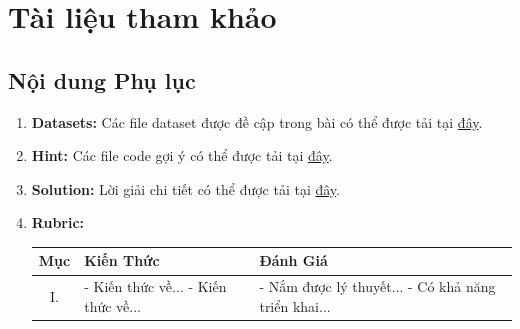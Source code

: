 \documentclass[12pt]{article}
\begin{document}
\newpage
\section{Tài liệu tham khảo}
\label{section:references}
\nocite{*} %
\printbibliography

\newpage
\begin{appendices}

\section{Nội dung Phụ lục}

\begin{enumerate}
    \item \textbf{Datasets:} Các file dataset được đề cập trong bài có thể được tải tại \href{https://aivietnam.edu.vn/}{đây}.
    \item \textbf{Hint:} Các file code gợi ý có thể được tải tại \href{https://aivietnam.edu.vn/}{đây}.
    \item \textbf{Solution:} Lời giải chi tiết có thể được tải tại \href{https://aivietnam.edu.vn/}{đây}.
    \item \textbf{Rubric:}

\begin{longtable}{|c|p{7.5cm}|p{7cm}|}
    \hline
    \textbf{Mục} & \textbf{Kiến Thức} & \textbf{Đánh Giá} \\\hline
    I. &
    - Kiến thức về... \newline
    - Kiến thức về...
    &
    - Nắm được lý thuyết... \newline
    - Có khả năng triển khai...
    \\\hline
\end{longtable}
\end{enumerate}

\end{appendices}
\end{document}
